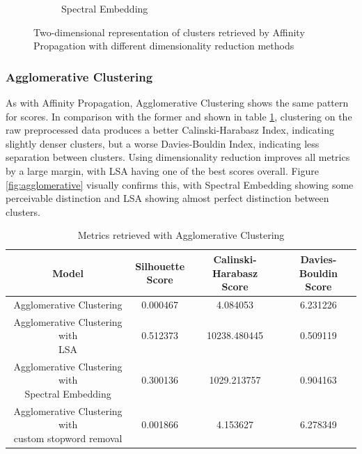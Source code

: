 \begin{figure}
\begin{subfigure}{.3\textwidth}
    \caption{Spectral Embedding}
    \label{fig:affinity_propagation_spectral}
  \end{subfigure}
  \caption{Two-dimensional representation of clusters retrieved by Affinity Propagation with different dimensionality reduction methods}
  \label{fig:affinity_propagation}
\end{figure}

\subsubsection{Agglomerative Clustering}

As with Affinity Propagation, Agglomerative Clustering shows the same pattern for scores. In comparison with the former and shown in table \ref{tab:scores_agglomerative}, clustering on the raw preprocessed data produces a better Calinski-Harabasz Index, indicating slightly denser clusters, but a worse Davies-Bouldin Index, indicating less separation between clusters.
Using dimensionality reduction improves all metrics by a large margin, with LSA having one of the best scores overall. Figure \ref{fig:agglomerative} visually confirms this, with Spectral Embedding showing some perceivable distinction and LSA showing almost perfect distinction between clusters.

\begin{table}[]
  \centering
  \begin{tabular}{c|c|c|c}
    Model &  \shortstack[c]{Silhouette \\ Score} & \shortstack[c]{Calinski-Harabasz \\ Score} &  \shortstack[c]{Davies-Bouldin \\ Score}  \\
    \hline
    \hline
    Agglomerative Clustering & 0.000467 & 4.084053 & 6.231226 \\
    \hline
    \shortstack[c]{Agglomerative Clustering with \\ LSA} & 0.512373 & 10238.480445 & 0.509119 \\
    \hline
    \shortstack[c]{Agglomerative Clustering with \\ Spectral Embedding} & 0.300136 & 1029.213757 & 0.904163 \\
    \hline
    \shortstack[c]{Agglomerative Clustering with \\ custom stopword removal} & 0.001866 & 4.153627 & 6.278349 \\
   \end{tabular}
  \caption{Metrics retrieved with Agglomerative Clustering}
  \label{tab:scores_agglomerative}
\end{table}

